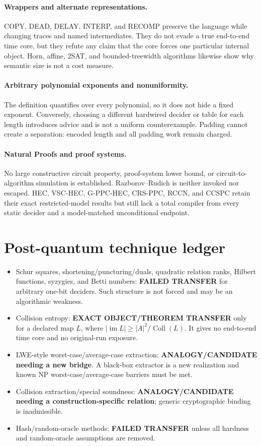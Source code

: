 \documentclass[11pt]{article}
\begin{document}
\paragraph{Wrappers and alternate representations.}
COPY, DEAD, DELAY, INTERP, and RECOMP preserve the language while changing
traces and named intermediates.  They do not evade a true end-to-end time
core, but they refute any claim that the core forces one particular internal
object.  Horn, affine, 2SAT, and bounded-treewidth algorithms likewise show
why semantic size is not a cost measure.

\paragraph{Arbitrary polynomial exponents and nonuniformity.}
The definition quantifies over every polynomial, so it does not hide a fixed
exponent.  Conversely, choosing a different hardwired decider or table for
each length introduces advice and is not a uniform counterexample.  Padding
cannot create a separation: encoded length and all padding work remain
charged.

\paragraph{Natural Proofs and proof systems.}
No large constructive circuit property, proof-system lower bound, or
circuit-to-algorithm simulation is established.  Razborov--Rudich is neither
invoked nor escaped.  HEC, VSC-HEC, G-PPC-HEC, CRS-PPC, RCCN, and CCSPC retain
their exact restricted-model results but still lack a total compiler from
every static decider and a model-matched unconditional endpoint.

\section{Post-quantum technique ledger}
\begin{itemize}[leftmargin=*]
\item Schur squares, shortening/puncturing/duals, quadratic relation ranks,
Hilbert functions, syzygies, and Betti numbers: \textbf{FAILED TRANSFER} for
arbitrary one-bit deciders.  Such structure is not forced and may be an
algorithmic weakness.
\item Collision entropy: \textbf{EXACT OBJECT/THEOREM TRANSFER} only for a
declared map \(L\), where
\( |\operatorname{im}L|\ge |A|^2/\operatorname{Coll}(L) \).  It gives no
end-to-end time core and no original-run exposure.
\item LWE-style worst-case/average-case extraction:
\textbf{ANALOGY/CANDIDATE needing a new bridge}.  A black-box extractor is a
new realization and known NP worst-case/average-case barriers must be met.
\item Collision extraction/special soundness:
\textbf{ANALOGY/CANDIDATE needing a construction-specific relation}; generic
cryptographic binding is inadmissible.
\item Hash/random-oracle methods: \textbf{FAILED TRANSFER} unless all
hardness and random-oracle assumptions are removed.
\end{itemize}
\end{document}
